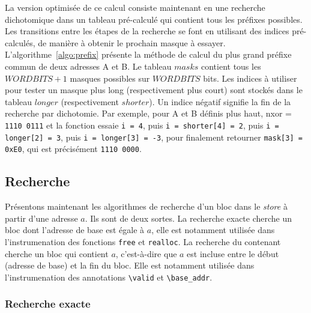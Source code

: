 La version optimisée de ce calcul consiste maintenant en une recherche
dichotomique dans un tableau pré-calculé qui contient tous les préfixes
possibles.
Les transitions entre les étapes de la recherche se font en utilisant des
indices pré-calculés, de manière à obtenir le prochain masque à essayer.
L'algorithme~\ref{algo:prefix} présente la méthode de calcul du plus grand
préfixe commun de deux adresses A et B.
Le tableau $masks$ contient tous les $WORDBITS+1$ masques possibles sur
$WORDBITS$ bits.
Les indices à utiliser pour tester un masque plus long (respectivement plus
court) sont stockés dans le tableau $longer$ (respectivement $shorter$).
Un indice négatif signifie la fin de la recherche par dichotomie.
Par exemple, pour A et B définis plus haut, nxor = \texttt{1110\,0111}
et la fonction essaie \lstinline'i = 4', puis \lstinline'i = shorter[4] = 2',
puis \lstinline'i = longer[2] = 3', puis \lstinline'i = longer[3] = -3', pour
finalement retourner \lstinline'mask[3] = 0xE0', qui
est précisément \texttt{1110\,0000}.


\subsection{Recherche}

Présentons maintenant les algorithmes de recherche d'un bloc dans le
\textit{store} à partir d'une adresse $a$.
Ils sont de deux sortes.
La recherche exacte cherche un bloc dont l'adresse de base est égale à $a$, elle
est notamment utilisée dans l'instrumenation des fonctions \lstinline'free' et
\lstinline'realloc'.
La recherche du contenant cherche un bloc qui contient $a$, c'est-à-dire que
$a$ est incluse entre le début (adresse de base) et la fin du bloc.
Elle est notamment utilisée dans l'instrumenation des annotations
\lstinline'\valid' et \lstinline'\base_addr'.

\subsubsection*{Recherche exacte}

